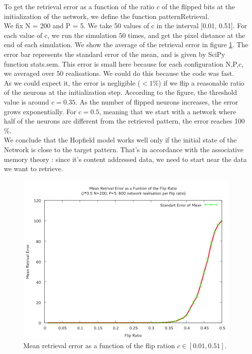 To get the retrieval error as a function of the ratio $c$ of the flipped bits at the initialization of the network, we define the function patternRetrieval. \\
We fix N = 200 and P = 5. We take 50 values of c in the interval [0.01, 0.51]. For each value of c, we run the simulation 50 times, and get the pixel distance 
at the end of each simulation. We show the average of the retrieval error in figure \ref{reterr}. 
The error bar represents the standard error of the mean, and is given by SciPy function stats.sem. This error is small here because for each configuration
N,P,c, we averaged over 50 realisations. We could do this because the code was fast.\\
As we could expect it, the error is negligible ($<1\%$) if we flip a reasonable 
ratio of the neurons at the initialization step. According to the figure, the threshold value is around $c = 0.35$. As the number of flipped neurons increases, the error grows exponentially. 
For $c=0.5$, meaning that we start with a network where half of the neurons are different from the retrieved pattern, the error reaches 100$\%$. \\
We conclude that the Hopfield model works well only if the initial state of the Network is close to the target pattern. That's in accordance with the 
associative memory theory : since it's content addressed data, we need to start near the data we want to retrieve.
\begin{center}
    \begin{figure}\label{reterr}
    \caption{Mean retrieval error as a function of the flip ration $c\in[0.01, 0.51]$.  }
    \includegraphics[scale=0.7]{img/ex11.png}
    \end{figure}
\end{center}

